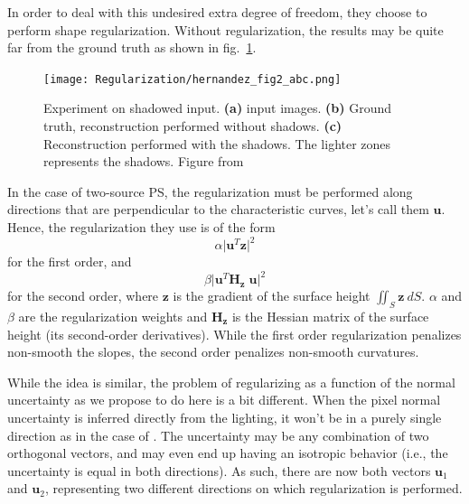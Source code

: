 In order to deal with this undesired extra degree of freedom, they choose to perform shape regularization. Without regularization, the results may be quite far from the ground truth as shown in fig.~\ref{fig:reg-her2}.

\begin{figure}
\centering
\texttt{[image: Regularization/hernandez\_fig2\_abc.png]}
\caption{Experiment on shadowed input. \textbf{(a)} input images. \textbf{(b)} Ground truth, reconstruction performed without shadows. \textbf{(c)} Reconstruction performed with the shadows. The lighter zones represents the shadows. Figure from~\cite{hernandez-pami-11}}
\label{fig:reg-her2}
\end{figure}

In the case of two-source PS, the regularization must be performed along directions that are perpendicular to the characteristic curves, let's call them $\mathbf{u}$. Hence, the regularization they use is of the form
\begin{equation}
\alpha \lvert \mathbf{u}^T \mathbf{z} \rvert ^2
\end{equation}
for the first order, and 
\begin{equation}
\beta \lvert \mathbf{u}^T \mathbf{H_z} \; \mathbf{u} \rvert ^2
\end{equation}
for the second order, where $\mathbf{z}$ is the gradient of the surface height $\iint_S\mathbf{z} \: dS$. $\alpha$ and $\beta$ are the regularization weights and $\mathbf{H_z}$ is the Hessian matrix of the surface height (its second-order derivatives). While the first order regularization penalizes non-smooth the slopes, the second order penalizes non-smooth curvatures.

While the idea is similar, the problem of regularizing as a function of the normal uncertainty as we propose to do here is a bit different. When the pixel normal uncertainty is inferred directly from the lighting, it won't be in a purely single direction as in the case of \cite{hernandez-pami-11}. The uncertainty may be any combination of two orthogonal vectors, and may even end up having an isotropic behavior (i.e., the uncertainty is equal in both directions). As such, there are now both vectors $\mathbf{u}_1$ and $\mathbf{u}_2$, representing two different directions on which regularization is performed.

